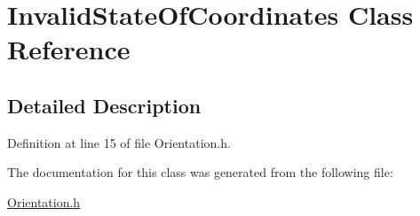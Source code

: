 \hypertarget{class_invalid_state_of_coordinates}{\section{Invalid\+State\+Of\+Coordinates Class Reference}
\label{class_invalid_state_of_coordinates}
}


\subsection{Detailed Description}


Definition at line 15 of file Orientation.\+h.



The documentation for this class was generated from the following file\+:\begin{DoxyCompactItemize}
\item 
\hyperlink{_orientation_8h}{Orientation.\+h}\end{DoxyCompactItemize}
